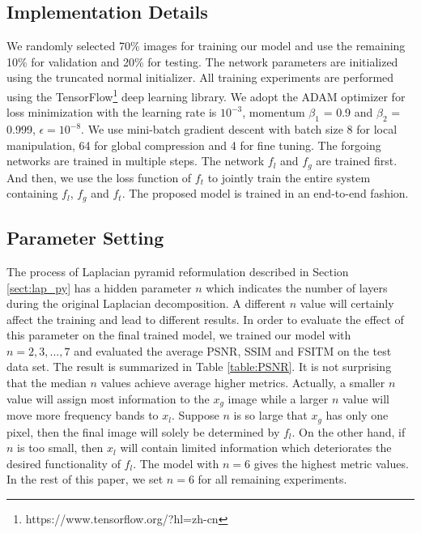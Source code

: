 \documentclass[journal]{IEEEtran}
\begin{document}
\subsection{Implementation Details}
We randomly selected 70\% images for training our model and use the remaining 10\% for validation and 20\% for testing.  
The network parameters are initialized using the truncated normal initializer. 
All training experiments are performed
using the TensorFlow\footnote{https://www.tensorflow.org/?hl=zh-cn} deep learning library. 
We adopt the ADAM optimizer for loss minimization with the learning rate is $10^{-3}$, momentum $\beta_1$ = 0.9 and $\beta_2$ = 0.999, $\epsilon = 10^{-8}$. We use mini-batch gradient descent with batch size 8 for local manipulation, 64 for global compression and 4 for fine tuning. 
The forgoing networks are trained in multiple steps. The network $f_l$ and $f_g$ are trained first. %
And then, we use the loss function of $f_t$ to jointly train the entire system containing $f_l$, $f_g$ and $f_t$.  The proposed model is trained in an end-to-end fashion.

\subsection{Parameter Setting}
The process of Laplacian pyramid reformulation described in Section \ref{sect:lap_py} has a hidden parameter $n$ which indicates the number of layers during the original Laplacian decomposition. A different $n$ value will certainly affect the training and lead to different results. In order to evaluate the effect of this parameter on the final trained model, we trained our model with $n=2, 3,..., 7$ and evaluated the average PSNR, SSIM \cite{Wang2004Image} and FSITM \cite{nafchi2014fsitm} on the test data set.  The result is summarized in Table \ref{table:PSNR}.  It is not surprising that the median $n$ values achieve average higher metrics. Actually, a smaller $n$ value will assign most information to the $x_g$ image while a larger $n$ value will move more frequency bands to $x_l$. Suppose $n$ is so large that $x_g$ has only one pixel, then the final image will solely be determined by $f_l$. On the other hand, if $n$ is too small, then $x_l$ will contain limited information which deteriorates the desired functionality of $f_l$.  The model with $n = 6$ gives the highest metric values. In the rest of this paper, we set $n = 6$ for all remaining experiments.
\end{document}
